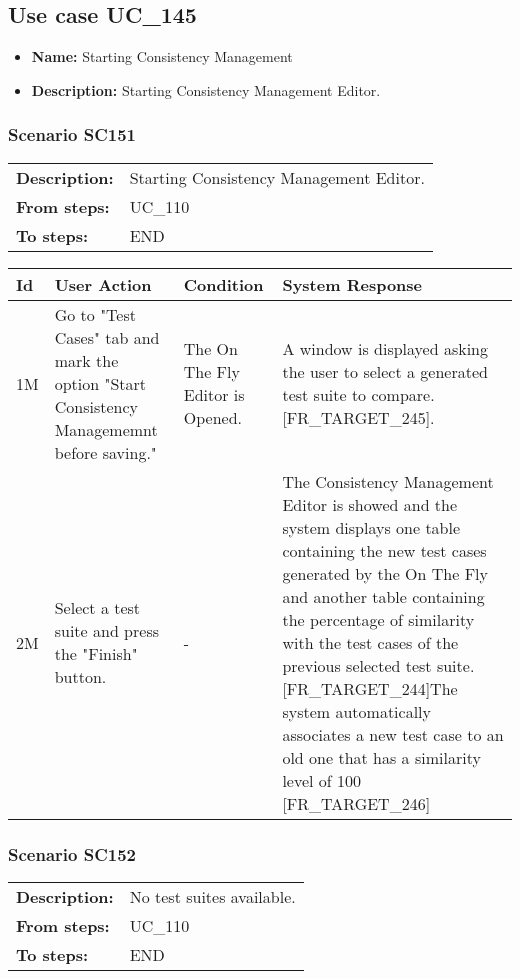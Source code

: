 \documentclass[a4paper,11pt]{article}
\newcommand{\bl}{\\ \hline}
\begin{document}
\subsection*{Use case UC_145}
\begin{itemize}
\item {\bf Name: }Starting Consistency Management
\item {\bf Description: }Starting Consistency Management Editor.
\end{itemize}
\subsubsection*{Scenario SC151}
\begin{tabular}{p{1in}p{4in}}
{\bf Description:} & Starting Consistency Management Editor. \\
{\bf From steps:} & UC_110#2M \\
{\bf To steps:} & END \\
\end{tabular}
 
\begin{tabular}{|p{0.8in}|p{1.6in}|p{1.6in}|p{1.6in}|}
\hline
Id & User Action & Condition & System Response  \bl 
1M & Go to "Test Cases" tab and mark the option "Start
						Consistency Managememnt before saving." & The On The Fly Editor is Opened. & A window is displayed asking the user to select a
						generated test suite to compare. [FR_TARGET_245]. \bl 
2M & Select a test suite and press the "Finish" button. & - & The Consistency Management Editor is showed and the
						system displays one table containing the new test cases generated
						by the On The Fly and another table containing the percentage of
						similarity with the test cases of the previous selected test
						suite. [FR_TARGET_244]The system automatically associates a new
						test case to an old one that has a similarity level of 100%
						[FR_TARGET_246] \bl 
\end{tabular}
\subsubsection*{Scenario SC152}
\begin{tabular}{p{1in}p{4in}}
{\bf Description:} & No test suites available. \\
{\bf From steps:} & UC_110#2M \\
{\bf To steps:} & END \\
\end{tabular}
 
\end{document}
